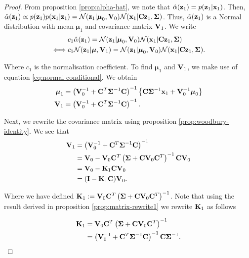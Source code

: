 \documentclass[11pt]{article}
\numberwithin{equation}{section}
\newcommand{\x}{{\bf x}}
\newcommand{\z}{{\bf z}}
\begin{document}
\begin{proof}
	From proposition \ref{prop:alpha-hat}, we note that $\hat\alpha(\z_1) = p(\z_1\vert\x_1)$. Then, $\hat\alpha(\z_1) \propto p(\z_1)p(\x_1\vert\z_1) = \mathcal{N}(\z_1 \vert \boldsymbol\mu_0, {\bf V}_0) \mathcal{N}(\x_1\vert {\bf C}\z_1, \boldsymbol\Sigma)$. Thus, $\hat\alpha(\z_1)$ is a Normal distribution with mean $\boldsymbol{\mu}_1$ and covariance matrix ${\bf V}_1$. We write
	\begin{align}
		&c_1 \hat\alpha(\z_1) = \mathcal{N}(\z_1 \vert \boldsymbol\mu_0, {\bf V}_0) \mathcal{N}(\x_1\vert {\bf C}\z_1, \boldsymbol\Sigma)\\
		\iff& c_1 \mathcal{N}(\z_1\vert \boldsymbol\mu, {\bf V}_1) = \mathcal{N}(\z_1 \vert \boldsymbol\mu_0, {\bf V}_0) \mathcal{N}(\x_1\vert {\bf C}\z_1, \boldsymbol\Sigma).
	\end{align}
	
	Where $c_1$ is the normalisation coefficient. To find $\boldsymbol{\mu}_1$ and ${\bf V}_1$, we make use of equation \ref{eq:normal-conditional}. We  obtain
	\begin{align}
		\boldsymbol{\mu}_1 &= \left({\bf V}_0^{-1} + {\bf C}^T\boldsymbol{\Sigma}^{-1} {\bf C}\right)^{-1} \left\{{\bf C}\boldsymbol\Sigma^{-1}\x_1 + {\bf V}_0^{-1}\boldsymbol\mu_0\right\}\\
		{\bf V}_1 &= \left({\bf V}_0^{-1} + {\bf C}^T\boldsymbol{\Sigma}^{-1} {\bf C}\right)^{-1}.
	\end{align}
	
	Next, we rewrite the covariance matrix using proposition \ref{prop:woodbury-identity}. We see that 
	\begin{align}
		{\bf V}_1 &= \left({\bf V}_0^{-1} + {\bf C}^T\boldsymbol{\Sigma}^{-1} {\bf C}\right)^{-1}\\
		&= {\bf V}_0 - {\bf V}_0 {\bf C}^T\left(\boldsymbol\Sigma + {\bf C}{\bf V}_0{\bf C}^T\right)^{-1}{\bf C}{\bf V}_0 \\
		&= {\bf V}_0 - {\bf K}_1{\bf C}{\bf V}_0\\
		&= ({\bf I} - {\bf K}_1{\bf C}){\bf V}_0. \label{eq:part-v1-rewrite}
	\end{align}
	
	Where we have defined ${\bf K}_1 := {\bf V}_0 {\bf C}^T\left(\boldsymbol\Sigma + {\bf C}{\bf V}_0{\bf C}^T\right)^{-1}$. Note that using the result derived in proposition \ref{prop:matrix-rewrite1} we rewrite ${\bf K}_1$ as follows
	
	\begin{align}
		{\bf K}_1 &= {\bf V}_0 {\bf C}^T\left(\boldsymbol\Sigma + {\bf C}{\bf V}_0{\bf C}^T\right)^{-1}\\
				  &= \left({\bf V}_0^{-1} + {\bf C}^T \boldsymbol\Sigma^{-1}{\bf C}\right)^{-1}{\bf C}\boldsymbol{\Sigma}^{-1}. \label{eq:part-k1-rewrite}
	\end{align}
	

\end{proof}
\end{document}
